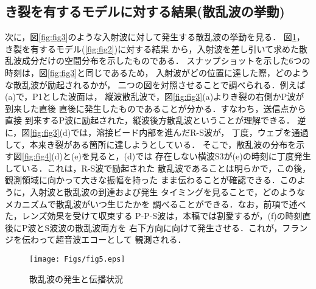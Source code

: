 \documentclass{jsce}
\begin{document}
\subsection{き裂を有するモデルに対する結果(散乱波の挙動)}
次に，図\ref{fig:fig3}のような入射波に対して発生する散乱波の挙動を見る．
図\ref{fig:fig5}，き裂を有するモデル(\ref{fig:fig2})に対する結果
から，入射波を差し引いて求めた散乱波成分だけの空間分布を示したものである．
スナップショットを示した6つの時刻は，図\ref{fig:fig3}と同じであるため，
入射波がどの位置に達した際，どのような散乱波が励起されるかが，
二つの図を対照させることで調べられる．例えば(a)で，P1とした波面は，
縦波散乱波で，図\ref{fig:fig3}(a)よりき裂の右側かP波が到来した直後
直後に発生したものであることが分かる．すなわち，送信点から直接
到来するP波に励起された，縦波後方散乱波ということが理解できる．
逆に，図\ref{fig:fig3}(d)では，溶接ビード内部を進んだR-S波が，
丁度，ウェブを通過して，本来き裂がある箇所に達しようとしている．
そこで，散乱波の分布を示す図\ref{fig:fig4}(d)と(e)を見ると，(d)では
存在しない横波S3が(e)の時刻に丁度発生している．これは，R-S波で励起された
散乱波であることは明らかで，この後，観測領域に向かって大きな振幅を持った
まま伝わることが確認できる．このように，入射波と散乱波の到達および発生
タイミングを見ることで，どのようなメカニズムで散乱波がいつ生じたかを
調べることができる．なお，前項で述べた，レンズ効果を受けて収束する
P-P-S波は，本稿では割愛するが，(f)の時刻直後にP波とS波波の散乱波両方を
右下方向に向けて発生させる．これが，フランジを伝わって超音波エコーとして
観測される．
\begin{figure}[h]
	\begin{center}
	\texttt{[image: Figs/fig5.eps]} 
	\end{center}
	\caption{
		散乱波の発生と伝播状況
	} 
	\label{fig:fig5}
\end{figure}
\end{document}
